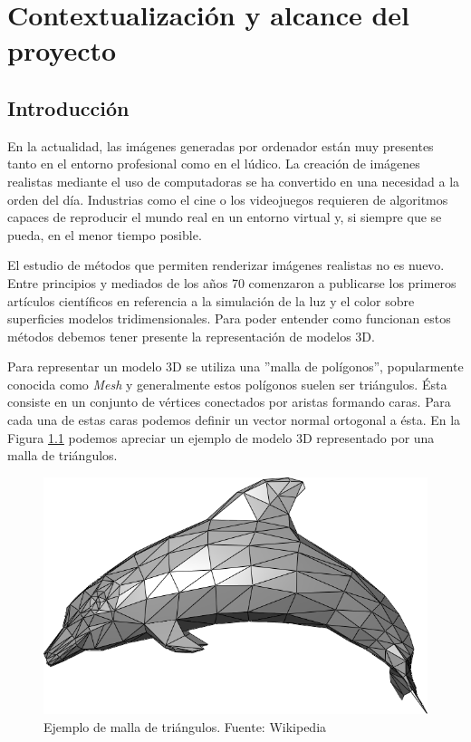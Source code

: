 \documentclass[titlepage,12pt]{report}
\begin{document}
\iftrue

\newpage
\tableofcontents*
\fi

\newpage

\chapter{Contextualización y alcance del proyecto}

\section{Introducción} \label{introduction}

En la actualidad, las imágenes generadas por ordenador están muy presentes tanto en el entorno profesional como en el lúdico. La creación de imágenes realistas mediante el uso de computadoras se ha convertido en una necesidad a la orden del día. Industrias como el cine o los videojuegos requieren de algoritmos capaces de reproducir el mundo real en un entorno virtual y, si siempre que se pueda, en el menor tiempo posible.

El estudio de métodos que permiten renderizar imágenes realistas no es nuevo. Entre principios y mediados de los años 70 comenzaron a publicarse los primeros artículos científicos en referencia a la simulación de la luz y el color sobre superficies modelos tridimensionales. Para poder entender como funcionan estos métodos debemos tener presente la representación de modelos 3D. 

Para representar un modelo 3D se utiliza una ''malla de polígonos'', popularmente conocida como \textit{Mesh} y generalmente estos polígonos suelen ser triángulos. Ésta consiste en un conjunto de vértices conectados por aristas formando caras. Para cada una de estas caras podemos definir un vector normal ortogonal a ésta. En la Figura \ref{dolphin} podemos apreciar un ejemplo de modelo 3D representado por una malla de triángulos.

\begin{figure}[H]
	\centering
	\includegraphics[scale=0.15]{media/Dolphin_triangle_mesh.png}
	\caption{Ejemplo de malla de triángulos. Fuente: Wikipedia}
	\label{dolphin}
\end{figure}
\end{document}
